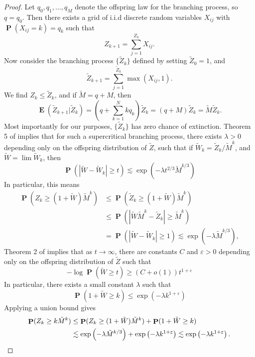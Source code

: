 \documentclass[dvipsnames,letterpaper,12pt]{article}
\numberwithin{equation}{section}
\theoremstyle{plain}
\DeclareMathOperator{\Prob}{\mathbf{P}}
\DeclareMathOperator{\Expect}{\mathbf{E}}
\begin{document}
\begin{proof}
	Let $q_0, q_1, \dots, q_M$ denote the offspring law for the branching process, so $q = q_0$. Then there exists a grid of i.i.d discrete random variables $X_{ij}$ with $\Prob(X_{ij} = k) = q_k$ such that
	\[ Z_{k+1} = \sum_{j = 1}^{Z_k} X_{ij}. \]
	Now consider the branching process $\{ \tilde{Z}_k \}$ defined by setting $\tilde{Z}_0 = 1$, and
	\[ \tilde{Z}_{k+1} = \sum_{j = 1}^{\tilde{Z}_k} \max(X_{ij}, 1). \]
	We find $Z_k \leq \tilde{Z}_k$, and if $\tilde{M} = q + M$, then
	\[ \Expect(\tilde{Z}_{k+1}|\tilde{Z}_k) = \left( q + \sum_{k = 1}^N k q_k \right) \tilde{Z}_k = (q + M) \tilde{Z}_k = \tilde{M} \tilde{Z}_k. \]
	Most importantly for our purposes, $\{ \tilde{Z}_k \}$ has zero chance of extinction. Theorem 5 of \cite{Athreya} implies that for such a supercritical branching process, there exists $\lambda > 0$ depending only on the offspring distribution of $\tilde{Z}$, such that if $\tilde{W}_k = \tilde{Z}_k / \tilde{M}^k$, and $\tilde{W} = \lim \tilde{W}_k$, then
	\[ \Prob(| \tilde{W} - \tilde{W}_k | \geq t) \lesssim \exp \left( - \lambda t^{2/3} \tilde{M}^{k/3} \right) \]
	In particular, this means
	\begin{align*}
		\Prob \left( Z_k \geq (1 + \tilde{W}) \tilde{M}^k \right) &\leq \Prob( \tilde{Z}_k \geq (1 + \tilde{W}) \tilde{M}^k )\\
		&\leq \Prob \left( | \tilde{W} \tilde{M}^k - \tilde{Z}_k | \geq \tilde{M}^k \right)\\
		&= \Prob \left( | \tilde{W} - \tilde{W}_k| \geq 1 \right) \lesssim \exp \left( - \lambda \tilde{M}^{k/3} \right),
	\end{align*}
	Theorem 2 of \cite{Biggins} implies that as $t \to \infty$, there are constants $C$ and $\varepsilon > 0$ depending only on the offspring distribution of $\tilde{Z}$ such that
	\[ - \log \Prob(\tilde{W} \geq t) \geq (C + o(1)) t^{1 + \varepsilon} \]
	In particular, there exists a small constant $\lambda$ such that
	\[ \Prob(1 + \tilde{W} \geq k) \leq \exp \left( - \lambda k^{1 + \varepsilon} \right) \]
	Applying a union bound gives
	\begin{align*}
		\Prob(Z_k \geq k \tilde{M}^k ) &\leq \Prob( Z_k \geq (1 + \tilde{W}) \tilde{M}^k ) + \Prob(1 + \tilde{W} \geq k)\\
		&\lesssim \exp \left( - \lambda \tilde{M}^{k/3} \right) + \exp \left( - \lambda k^{1 + \varepsilon} \right) \lesssim \exp \left( - \lambda k^{1 + \varepsilon} \right). \qedhere
	\end{align*}
\end{proof}
\end{document}

